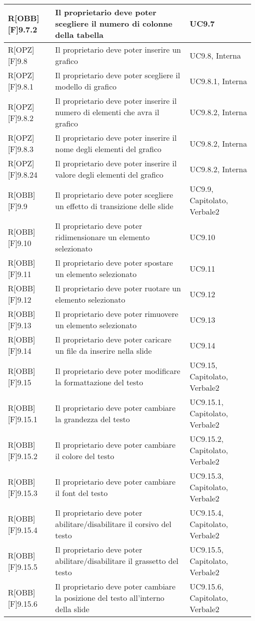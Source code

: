 	\begin{table}[h]
		\begin{tabular}{|p{}|p{}|p{}|}
			\midrule
			
R[OBB][F]9.7.2 & Il proprietario deve poter scegliere il numero di colonne della tabella & UC9.7 \\ \midrule
R[OPZ][F]9.8 & Il proprietario deve poter inserire un grafico & UC9.8, Interna \\ \midrule
R[OPZ][F]9.8.1 & Il proprietario deve poter scegliere il modello di grafico  & UC9.8.1, Interna \\ \midrule
R[OPZ][F]9.8.2 & Il proprietario deve poter inserire il numero di elementi che avra il grafico & UC9.8.2, Interna \\ \midrule
R[OPZ][F]9.8.3 & Il proprietario deve poter inserire il nome degli elementi del grafico  & UC9.8.2, Interna \\ \midrule
R[OPZ][F]9.8.24 & Il proprietario deve poter inserire il valore degli elementi del grafico & UC9.8.2, Interna \\ \midrule
R[OBB][F]9.9 & Il proprietario deve poter scegliere un effetto di transizione delle \gls{slide} & UC9.9, Capitolato, Verbale2 \\ \midrule
R[OBB][F]9.10 & Il proprietario deve poter ridimensionare un elemento selezionato & UC9.10 \\ \midrule
R[OBB][F]9.11 & Il proprietario deve poter spostare un elemento selezionato & UC9.11 \\ \midrule
R[OBB][F]9.12 & Il proprietario deve poter ruotare un elemento selezionato & UC9.12 \\ \midrule
R[OBB][F]9.13 & Il proprietario deve poter rimuovere un elemento selezionato & UC9.13 \\ \midrule
R[OBB][F]9.14 & Il proprietario deve poter caricare un file da inserire nella \gls{slide} & UC9.14 \\ \midrule
R[OBB][F]9.15 & Il proprietario deve poter modificare la formattazione del testo & UC9.15, Capitolato, Verbale2 \\ \midrule
R[OBB][F]9.15.1 & Il proprietario deve poter cambiare la grandezza del testo & UC9.15.1, Capitolato, Verbale2 \\ \midrule
R[OBB][F]9.15.2 & Il proprietario deve poter cambiare il colore del testo & UC9.15.2, Capitolato, Verbale2 \\ \midrule
R[OBB][F]9.15.3 & Il proprietario deve poter cambiare il \gls{font} del testo & UC9.15.3, Capitolato, Verbale2 \\ \midrule
R[OBB][F]9.15.4 & Il proprietario deve poter abilitare/disabilitare il corsivo del testo & UC9.15.4, Capitolato, Verbale2 \\ \midrule
R[OBB][F]9.15.5 & Il proprietario deve poter abilitare/disabilitare il grassetto del testo & UC9.15.5, Capitolato, Verbale2 \\ \midrule
R[OBB][F]9.15.6 & Il proprietario deve poter cambiare la posizione del testo all'interno della \gls{slide} & UC9.15.6, Capitolato, Verbale2 \\ \midrule

		\end{tabular}
	\end{table}
